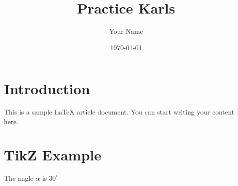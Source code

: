 \documentclass{article}
\title{Practice Karls}
\author{Your Name}
\date{\today}
\begin{document}
\maketitle

\section{Introduction}

This is a sample LaTeX article document. You can start writing your content here.

\section{TikZ Example}
 The angle $ \alpha $ is $30^{\circ}$ 
\end{document}
